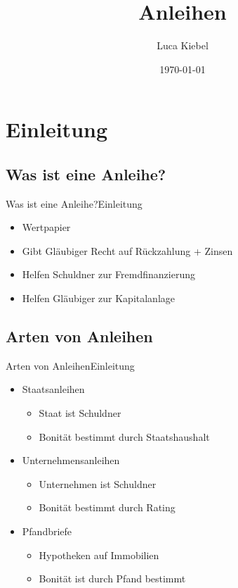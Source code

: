 \documentclass[10pt,a4paper, ngerman]{beamer}
\author{Luca Kiebel}
\title{Anleihen}
\date{\today}
\institute[HBBK]{Hans-Böckler-Berufskolleg}
\begin{document}
\begin{frame}
\titlepage
\end{frame}

\section{Einleitung}
\subsection{Was ist eine Anleihe?}
\begin{frame}{Was ist eine Anleihe?}{Einleitung}
\begin{itemize}
	\item Wertpapier
	\item Gibt Gläubiger Recht auf Rückzahlung + Zinsen
	\item Helfen Schuldner zur Fremdfinanzierung
	\item Helfen Gläubiger zur Kapitalanlage
\end{itemize}
\end{frame}

\subsection{Arten von Anleihen}
\begin{frame}{Arten von Anleihen}{Einleitung}
\begin{itemize}
	\item Staatsanleihen
	\begin{itemize}
		\item<2-> Staat ist Schuldner
		\item<2-> Bonität bestimmt durch Staatshaushalt
	\end{itemize}
	\item Unternehmensanleihen
	\begin{itemize}
		\item<3-> Unternehmen ist Schuldner
		\item<3-> Bonität bestimmt durch Rating
	\end{itemize}
	\item Pfandbriefe
	\begin{itemize}
		\item<4-> Hypotheken auf Immobilien
		\item<4-> Bonität ist durch Pfand bestimmt
	\end{itemize}
\end{itemize}
\end{frame}
\end{document}
